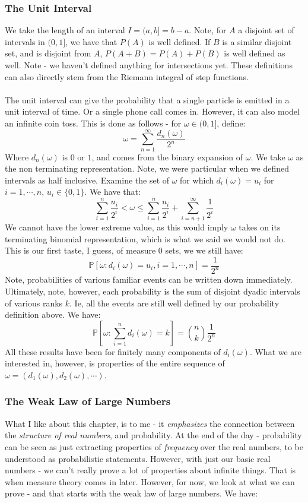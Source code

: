 \documentclass[12pt,a4paper]{article}
\newcommand{\1}[1]{\mathbbm{1}\left\{ #1 \right\}}
\newcommand{\Prob}{\mathbb{P}}
\begin{document}
\subsubsection{The Unit Interval} 
We take the length of an interval $I = (a,b] = b - a$. Note, for $A$ a disjoint set of intervals in $(0,1]$, we have that $P(A)$ is well defined. If $B$ is a similar disjoint set, and is disjoint from $A$, $P(A + B) = P(A) + P(B)$ is well defined as well. Note - we haven't defined anything for intersections yet. These definitions can also directly stem from the Riemann integral of step functions.
\\\\
The unit interval can give the probability that a single particle is emitted in a unit interval of time. Or a single phone call comes in. However, it can also model an infinite coin toss. This is done as follows - for $\omega \in (0,1]$, define:
$$
	\omega = \sum_{n=1}^\infty \frac{d_n(\omega)}{2^n}
$$
Where $d_n(\omega)$ is $0$ or $1$, and comes from the binary expansion of $\omega$. We take $\omega$ as the non terminating representation. Note, we were particular when we defined intervals as half inclusive. Examine the set of $\omega$ for which $d_i(\omega) = u_i$ for $i = 1, \cdots, n$, $u_i \in \{0,1\}$. We have that:
$$
	\sum_{i=1}^n \frac{u_i}{2^i} < \omega \leq \sum_{i=1}^n \frac{u_i}{2^i} + \sum_{i=n+1}^\infty \frac{1}{2^i}
$$
We cannot have the lower extreme value, as this would imply $\omega$ takes on its terminating binomial representation, which is what we said we would not do. This is our first taste, I guess, of measure $0$ sets, we we still have:
$$
	\Prob\left[\omega: d_i(\omega) = u_i, i = 1, \cdots, n \right] = \frac{1}{2^n}
$$
Note, probabilities of various familiar events can be written down immediately. Ultimately, note, however, each probability is the sum of disjoint dyadic intervals of various ranks $k$. Ie, all the events are still well defined by our probability definition above. We have:
$$
	\Prob\left[\omega : \sum_{i=1}^n d_i(\omega) = k\right] = {n \choose k} \frac{1}{2^n}
$$
All these results have been for finitely many components of $d_i(\omega)$. What we are interested in, however, is properties of the entire sequence of $\omega = (d_1(\omega), d_2(\omega), \cdots)$. 

\subsubsection{The Weak Law of Large Numbers}
What I like about this chapter, is to me - it \textit{emphasizes} the connection between the \textit{structure of real numbers}, and probability. At the end of the day - probability can be seen as just extracting properties of \textit{frequency} over the real numbers, to be understood as probabilistic statements. However, with just our basic real numbers - we can't really prove a lot of properties about infinite things. That is when measure theory comes in later. However, for now, we look at what we can prove - and that starts with the weak law of large numbers. We have:
\end{document}
